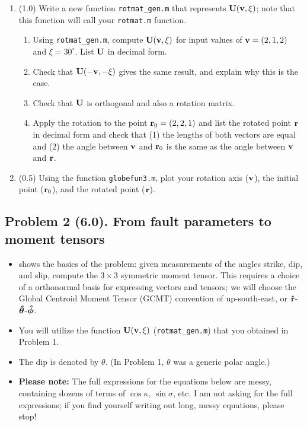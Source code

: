\documentclass[11pt,titlepage,fleqn]{article}
\newcommand{\rotangB}{\xi}    %
\newcommand{\rotvec}{\bv}      %
\begin{document}
\begin{enumerate}
\item (1.0) Write a new function \verb+rotmat_gen.m+ that represents $\bU(\rotvec,\rotangB)$; note that this function will call your \verb+rotmat.m+ function.
%
\begin{enumerate}
\item Using \verb+rotmat_gen.m+, compute $\bU(\rotvec,\rotangB)$ for input values of $\rotvec = (2,1,2)$ and $\rotangB = 30^\circ$. List $\mbox{${\bf U}$}$ in decimal form.
\item Check that $\bU(-\rotvec,-\rotangB)$ gives the same result, and explain why this is the case.
\item Check that $\mbox{${\bf U}$}$ is orthogonal and also a rotation matrix.
\item Apply the rotation to the point $\mbox{${\bf r}$}_0 = (2,2,1)$ and list the rotated point $\mbox{${\bf r}$}$ in decimal form and check that (1) the lengths of both vectors are equal and (2) the angle between $\rotvec$ and $\mbox{${\bf r}$}_0$ is the same as the angle between  $\rotvec$ and $\mbox{${\bf r}$}$.
\end{enumerate}

\item (0.5) Using the function \verb+globefun3.m+, plot your rotation axis ($\rotvec$), the initial point ($\mbox{${\bf r}$}_0$), and the rotated point ($\mbox{${\bf r}$}$).

\end{enumerate}


\subsection*{Problem 2 (6.0). From fault parameters to moment tensors}

\begin{itemize}
\item {} shows the basics of the problem: given measurements of the angles strike, dip, and slip, compute the $3 \times 3$ symmetric moment tensor. This requires a choice of a orthonormal basis for expressing vectors and tensors; we will choose the Global Centroid Moment Tensor (GCMT) convention of up-south-east, or $\mbox{\boldmath{$\hat{\rm r}$}}$-$\mbox{\boldmath{$\hat{\theta}$}}$-$\mbox{\boldmath{$\hat{\phi}$}}$.

\item You will utilize the function $\bU(\rotvec,\rotangB)$ (\verb+rotmat_gen.m+) that you obtained in Problem 1.

\item The dip is denoted by $\theta$. (In Problem 1, $\theta$ was a generic polar angle.)

\item {\bf Please note:} The full expressions for the equations below are messy, containing dozens of terms of $\cos\kappa$, $\sin\sigma$, etc. I am not asking for the full expressions; if you find yourself writing out long, messy equations, please stop!
\end{itemize}
\end{document}
